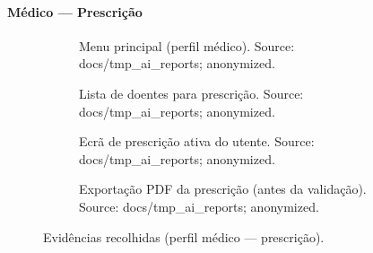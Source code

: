 \paragraph{Médico — Prescrição}
\begin{figure}[htbp]
    \centering
    \begin{subfigure}[t]{0.48\textwidth}
        \centering
        \caption{Menu principal (perfil médico). Source: docs/tmp\_ai\_reports; anonymized.}
        \label{fig:med_prescricao_menu}
    \end{subfigure}\hfill
    \begin{subfigure}[t]{0.48\textwidth}
        \centering
        \caption{Lista de doentes para prescrição. Source: docs/tmp\_ai\_reports; anonymized.}
        \label{fig:med_prescricao_lista_doentes}
    \end{subfigure}
    \begin{subfigure}[t]{0.48\textwidth}
        \centering
        \caption{Ecrã de prescrição ativa do utente. Source: docs/tmp\_ai\_reports; anonymized.}
        \label{fig:med_prescricao_utente}
    \end{subfigure}\hfill
    \begin{subfigure}[t]{0.48\textwidth}
        \centering
        \caption{Exportação PDF da prescrição (antes da validação). Source: docs/tmp\_ai\_reports; anonymized.}
        \label{fig:med_prescricao_pdf}
    \end{subfigure}
    \caption{Evidências recolhidas (perfil médico — prescrição).}
\end{figure}

